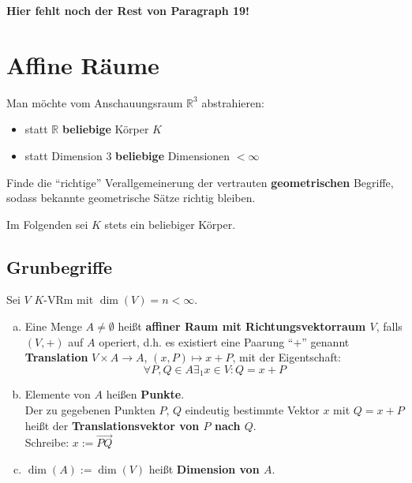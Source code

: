 \documentclass[parskip,a4paper,twoside,DIV15,BCOR12mm]{scrbook}
\begin{document}
\textbf{\color{red}Hier fehlt noch der Rest von Paragraph 19!}

\chapter{Affine Räume}

Man möchte vom Anschauungsraum $\mathbb{R}^3$ abstrahieren:
\begin{itemize}
\item statt $\mathbb{R}$ \textbf{beliebige} Körper $K$
\item statt Dimension $3$ \textbf{beliebige} Dimensionen $< \infty$
\end{itemize}

\begin{task}
Finde die "`richtige"' Verallgemeinerung der vertrauten \textbf{geometrischen} 
Begriffe, sodass bekannte geometrische Sätze richtig bleiben.
\end{task}

Im Folgenden sei $K$ stets ein beliebiger Körper.

\section{Grunbegriffe}
\begin{definition}
Sei $V$ $K$-VRm mit $\dim(V)=n<\infty$.
\begin{enumerate}[(a)]
\item Eine Menge $A \ne \emptyset$ heißt \textbf{affiner Raum mit Richtungsvektorraum $V$},
falls $(V,+)$ auf $A$ operiert, d.h. es existiert eine Paarung "`$+$"' genannt
\textbf{Translation} $V \times A \to A$, $(x,P) \mapsto x+P$, mit der Eigentschaft:
\[\forall P,Q\in A\exists_1 x\in V: Q=x+P\]
\item Elemente von $A$ heißen \textbf{Punkte}.\\
Der zu gegebenen Punkten $P$, $Q$ eindeutig bestimmte Vektor $x$ mit $Q=x+P$ heißt
der \textbf{Translationsvektor von $P$ nach $Q$}.\\
Schreibe: $x:=\overrightarrow{PQ}$
\item $\dim(A) := \dim(V)$ heißt \textbf{Dimension von $A$}.
\end{enumerate}
\end{definition}
\end{document}

